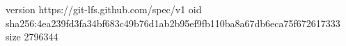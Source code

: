 version https://git-lfs.github.com/spec/v1
oid sha256:4ea239fd3fa34bf683c49b76d1ab2b95ef9fb110ba8a67db6eca75f672617333
size 2796344
